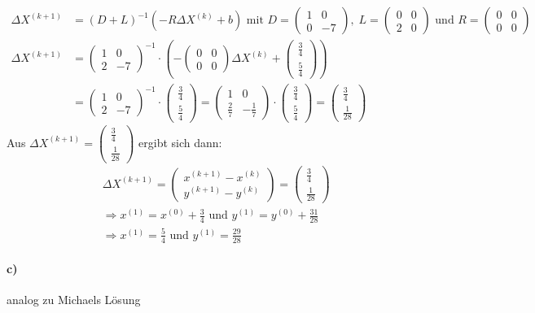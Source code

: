 \begin{align*}
\Delta X^{(k+1)}&=(D+L)^{-1}(-R\Delta X^{(k)}+b) \text{ mit }D=\begin{pmatrix} 1 & 0\\0 & -7 \end{pmatrix},\; L=\begin{pmatrix}
0 & 0 \\ 2 & 0\end{pmatrix} \text{ und } R=\begin{pmatrix}
0 & 0 \\ 0 & 0 \end{pmatrix}\\
\Delta X^{(k+1)}&= \begin{pmatrix} 1 & 0\\2 & -7 \end{pmatrix}^{-1}\cdot\left(-\begin{pmatrix}0 & 0 \\ 0 & 0 \end{pmatrix} \Delta X^{(k)}+ \begin{pmatrix}\frac{3}{4} \\ \frac{5}{4}\end{pmatrix}\right)\\
&= \begin{pmatrix} 1 & 0\\2 & -7 \end{pmatrix}^{-1}\cdot \begin{pmatrix}\frac{3}{4} \\ \frac{5}{4}\end{pmatrix}=\begin{pmatrix} 1 & 0\\\frac{2}{7} & -\frac{1}{7} \end{pmatrix}\cdot \begin{pmatrix}\frac{3}{4} \\ \frac{5}{4}\end{pmatrix}=\begin{pmatrix}
\frac{3}{4}\\\frac{1}{28}
\end{pmatrix}
\end{align*}
Aus $\Delta X^{(k+1)}=\begin{pmatrix}
\frac{3}{4}\\\frac{1}{28}
\end{pmatrix}$ ergibt sich dann:
\begin{align*}
&\Delta X^{(k+1)}=\begin{pmatrix}
x^{(k+1)}-x^{(k)} \\ y^{(k+1)}-y^{(k)}\end{pmatrix}=\begin{pmatrix}
\frac{3}{4}\\\frac{1}{28}
\end{pmatrix}\\
&\Rightarrow x^{(1)}=x^{(0)}+\frac{3}{4} \text{ und } y^{(1)}=y^{(0)}+\frac{31}{28}\\
&\Rightarrow x^{(1)}=\frac{5}{4} \text{ und } y^{(1)}=\frac{29}{28}
\end{align*}
\paragraph{c)} analog zu Michaels Lösung
